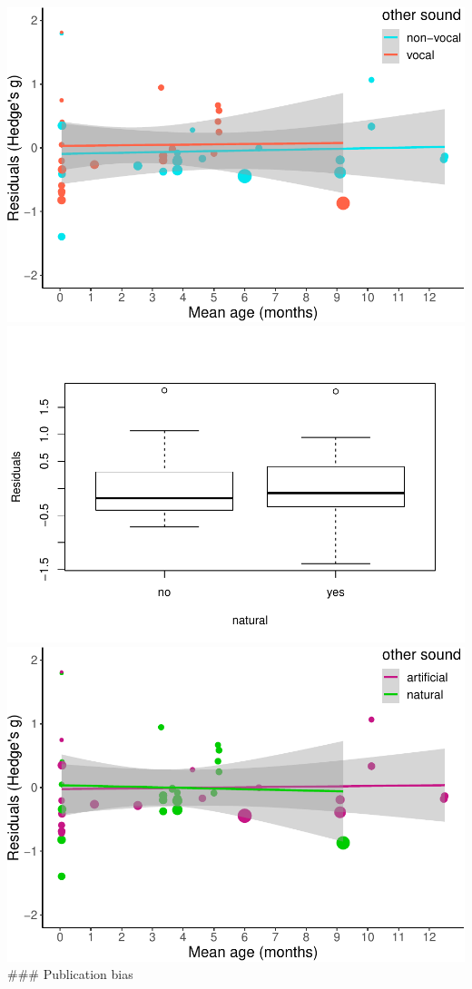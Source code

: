 \documentclass[man]{apa6}
\begin{document}
\includegraphics{MA_speech_pref_files/figure-latex/residuals-1.pdf}
\includegraphics{MA_speech_pref_files/figure-latex/residuals-2.pdf}
\includegraphics{MA_speech_pref_files/figure-latex/residuals-3.pdf}
\#\#\# Publication bias
\end{document}
